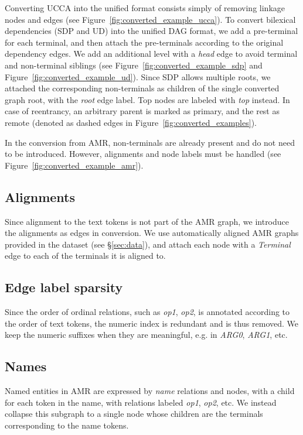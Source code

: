 \documentclass[11pt,a4paper]{article}
\begin{document}
Converting UCCA into the unified format consists simply of removing linkage nodes
and edges (see Figure~\ref{fig:converted_example_ucca}).
To convert bilexical dependencies (SDP and UD) into the unified DAG format,
we add a pre-terminal for each terminal,
and then attach the pre-terminals according to the original dependency edges.
We add an additional level with a \textit{head} edge to avoid terminal and non-terminal siblings
(see Figure~\ref{fig:converted_example_sdp} and Figure~\ref{fig:converted_example_ud}).
Since SDP allows multiple roots, we attached the corresponding non-terminals as children of
the single converted graph root, with the \textit{root} edge label.
Top nodes are labeled with \textit{top} instead.
In case of reentrancy, an arbitrary parent is marked as primary, and the rest as remote
(denoted as dashed edges in Figure~\ref{fig:converted_examples}).

In the conversion from AMR, non-terminals are already present and do not need to be introduced.
However, alignments and node labels must be handled
(see Figure~\ref{fig:converted_example_amr}).

\subsection{Alignments}
Since alignment to the text tokens is not part of the AMR graph,
we introduce the alignments as edges in conversion.
We use automatically aligned AMR graphs provided in the dataset (see \S\ref{sec:data}),
and attach each node with a \textit{Terminal} edge to each of the terminals it is aligned to.

\subsection{Edge label sparsity}
Since the order of ordinal relations, such as \textit{op1}, \textit{op2},
is annotated according to the order of text tokens,
the numeric index is redundant and is thus removed.
We keep the numeric suffixes when they are meaningful, e.g. in \textit{ARG0}, \textit{ARG1}, etc.

\subsection{Names}
Named entities in AMR are expressed by \textit{name} relations and nodes, with
a child for each token in the name, with relations labeled \textit{op1}, \textit{op2}, etc.
We instead collapse this subgraph to a single node whose children are the terminals
corresponding to the name tokens.
\end{document}
